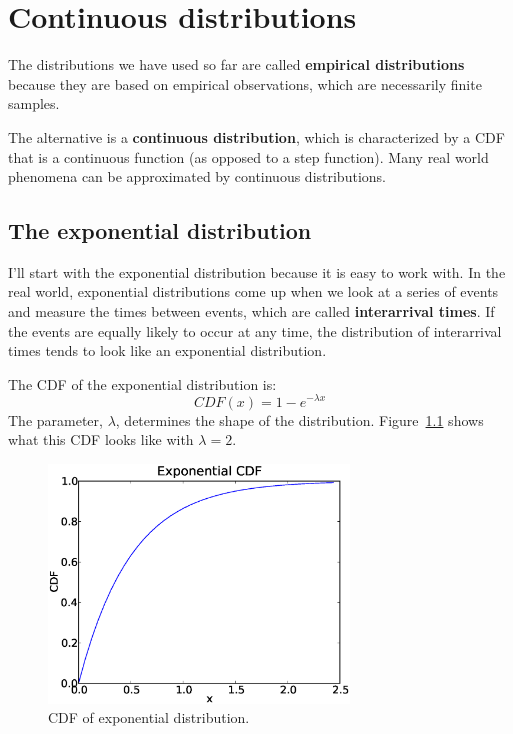 \documentclass[12pt]{book}
\begin{document}
\chapter{Continuous distributions}
\label{continuous}

The distributions we have used so far are called {\bf
  empirical distributions} because they are based on empirical
observations, which are necessarily finite samples.

The alternative is a {\bf continuous distribution}, which is
characterized by a CDF that is a continuous function (as opposed to a
step function).  Many real world phenomena can be approximated by
continuous distributions.

\section{The exponential distribution}

I'll start with the exponential distribution because it is
easy to work with.  In the real world, exponential distributions
come up when we look at a series of events and measure the
times between events, which are called {\bf interarrival times}.
If the events are equally likely to occur at any time, the distribution
of interarrival times tends to look like an exponential distribution.


The CDF of the exponential distribution is:
%
\[ CDF(x) = 1 - e^{-\lambda x} \]
%
The parameter, $\lambda$, determines the shape of the
distribution.  Figure~\ref{expo_cdf} shows what this CDF looks like with
$\lambda = 2$.



\begin{figure}
\centerline{\includegraphics[height=2.5in]{figs/expo_cdf.eps}}
\caption{CDF of exponential distribution.}
\label{expo_cdf}
\end{figure}
\end{document}
